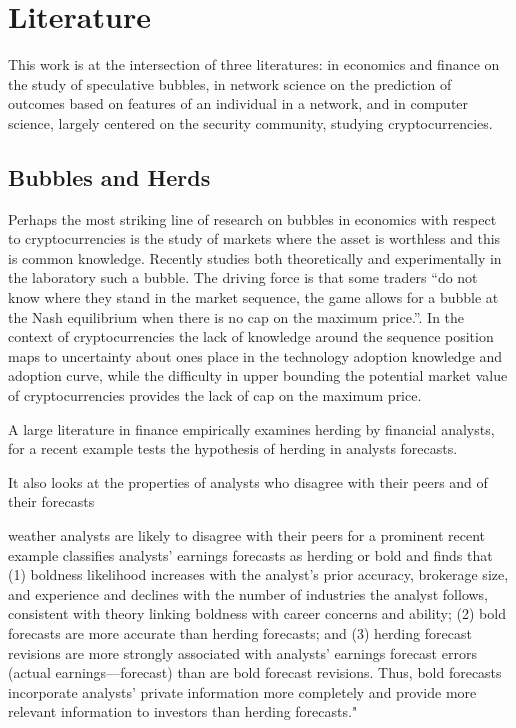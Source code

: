 \section{Literature}

This work is at the intersection of three literatures: in economics and finance on the study of speculative bubbles, in network science on the prediction of outcomes based on features of an individual in a network, and in computer science, largely centered on the security community, studying cryptocurrencies\cite{bonneau2014mixcoin, ron2014did}.


\subsection{Bubbles and Herds}

Perhaps the most striking line of research on bubbles in economics with respect to cryptocurrencies is the study of markets where the asset is worthless and this is common knowledge. 
Recently \cite{moinas2013bubble} studies both theoretically and experimentally in the laboratory such a bubble. 
The driving force is that some traders ``do not know where they stand in the market sequence, the game allows for
a bubble at the Nash equilibrium when there is no cap on the maximum price.''.
In the context of cryptocurrencies the lack of knowledge around the sequence position maps to uncertainty about ones place in the technology adoption knowledge and adoption curve, while the difficulty in upper bounding the potential market value of cryptocurrencies provides the lack of cap on the maximum price. 


A large literature in finance empirically examines herding by financial analysts, for a recent example\cite{jegadeesh2009analysts} tests the hypothesis of herding in analysts forecasts. 

It also looks at the properties of analysts who disagree with their peers and of their forecasts

 \cite{clement2005financial} 
weather analysts are likely to disagree with their peers for a prominent recent example classifies analysts' earnings forecasts as herding or bold and finds that (1) boldness likelihood increases with the analyst's prior accuracy, brokerage size, and experience and declines with the number of industries the analyst follows, consistent with theory linking boldness with career concerns and ability; (2) bold forecasts are more accurate than herding forecasts; and (3) herding forecast revisions are more strongly associated with analysts' earnings forecast errors (actual earnings—forecast) than are bold forecast revisions. Thus, bold forecasts incorporate analysts' private information more completely and provide more relevant information to investors than herding forecasts."


